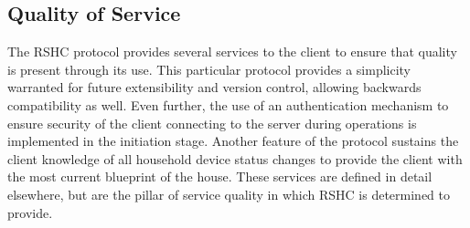 \subsection{Quality of Service}
\label{sec:pdus:qos}

The RSHC protocol provides several services to the client to ensure that quality is present through its use. This particular protocol provides a simplicity warranted for future extensibility and version control, allowing backwards compatibility as well. Even further, the use of an authentication mechanism to ensure security of the client connecting to the server during operations is implemented in the initiation stage. Another feature of the protocol sustains the client knowledge of all household device status changes to provide the client with the most current blueprint of the house. These services are defined in detail elsewhere, but are the pillar of service quality in which RSHC is determined to provide.
